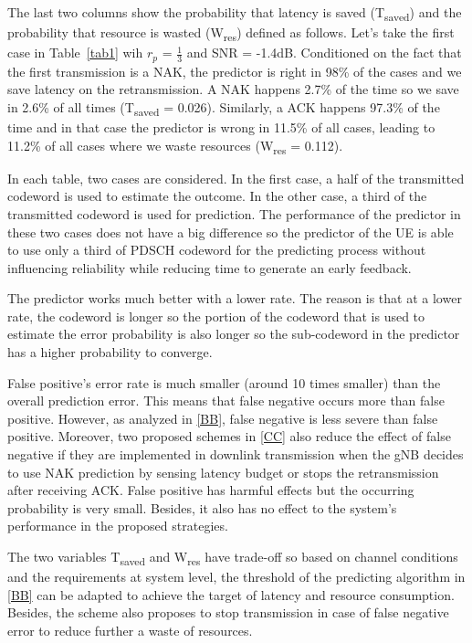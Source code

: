 \documentclass[conference]{IEEEtran}
\begin{document}
The last two columns show the probability that latency is saved (T\textsubscript{saved}) and the probability that resource is wasted (W\textsubscript{res}) defined as follows. Let's take the first case in Table~\ref{tab1} wih $r_{p}$ = $\frac{1}{3}$ and SNR = -1.4dB. Conditioned on the fact that the first transmission is a NAK, the predictor is right in 98\% of the cases and we save latency on the retransmission. A NAK happens 2.7\% of the time so we save in 2.6\% of all times (T\textsubscript{saved} = 0.026). Similarly, a ACK happens 97.3\% of the time and in that case the predictor is wrong in 11.5\% of all cases, leading to 11.2\% of all cases where we waste resources (W\textsubscript{res} = 0.112).

In each table, two cases are considered. In the first case, a half of the transmitted codeword is used to estimate the outcome. In the other case, a third of the transmitted codeword is used for prediction. The performance of the predictor in these two cases does not have a big difference so the predictor of the UE is able to use only a third of PDSCH codeword for the predicting process without influencing reliability while reducing time to generate an early feedback.

The predictor works much better with a lower rate. The reason is that at a lower rate, the codeword is longer so the portion of the codeword that is used to estimate the error probability is also longer so the sub-codeword in the predictor has a higher probability to converge.

False positive's error rate is much smaller (around 10 times smaller) than the overall prediction error. This means that false negative occurs more than false positive. However, as analyzed in \ref{BB}, false negative is less severe than false positive. Moreover, two proposed schemes in \ref{CC} also reduce the effect of false negative if they are implemented in downlink transmission when the gNB decides to use NAK prediction by sensing latency budget or stops the retransmission after receiving ACK. False positive has harmful effects but the occurring probability is very small. Besides, it also has no effect to the system's performance in the proposed strategies. 

The two variables T\textsubscript{saved} and W\textsubscript{res} have trade-off so based on channel conditions and the requirements at system level, the threshold of the predicting algorithm in \ref{BB} can be adapted to achieve the target of latency and resource consumption. Besides, the scheme also proposes to stop transmission in case of false negative error to reduce further a waste of resources.
\end{document}
